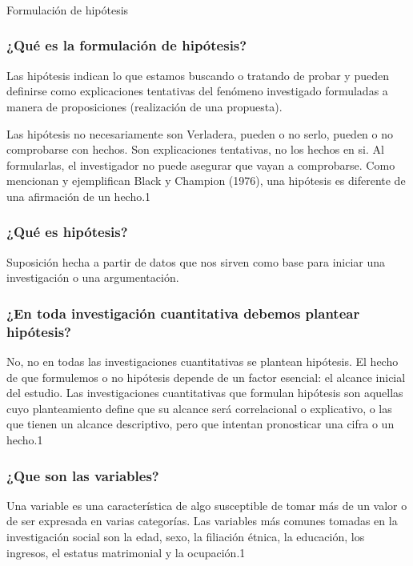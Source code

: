\documentclass{beamer}
\begin{document}
\begin{frame}
	\frametitle{}
	\begin{center}
		{\LARGE Formulación de hipótesis }
	\end{center}						
\end{frame}

	 	
	\begin{frame}
		\frametitle{¿Qué es la formulación de hipótesis?}
		\begin{definition}
			Las hipótesis indican lo que estamos buscando o tratando de probar y pueden definirse como explicaciones tentativas del fenómeno investigado formuladas a manera de proposiciones (realización de una propuesta). 
			
			Las hipótesis no necesariamente    son Verladera, pueden o no serlo, pueden o no comprobarse con hechos. Son explicaciones tentativas, no los hechos en si. Al formularlas, el investigador no puede asegurar que vayan a comprobarse. Como mencionan y ejemplifican Black y Champion (1976), una hipótesis es diferente de una afirmación de un hecho.{1}
			
		\end{definition}
	
	\end{frame}
	\begin{frame}
		\frametitle{¿Qué es hipótesis?}
		\begin{definition}
		Suposición hecha a partir de datos que nos sirven como base para iniciar una investigación o una argumentación.
		\end{definition}
	\end{frame}
		\begin{frame}
			\frametitle{¿En toda investigación cuantitativa debemos
				plantear hipótesis?}
			\begin{definition}
				No, no en todas las investigaciones cuantitativas se plantean hipótesis. El hecho de que formulemos
				o no hipótesis depende de un factor esencial: el alcance inicial del estudio. Las investigaciones cuantitativas
				que formulan hipótesis son aquellas cuyo planteamiento define que su alcance será correlacional
				o explicativo, o las que tienen un alcance descriptivo, pero que intentan pronosticar una cifra
				o un hecho.{1}
			\end{definition}
			
		\end{frame}
	\begin{frame}
		\frametitle{¿Que son las variables?}
		\begin{definition}
			Una variable es una característica de algo susceptible de tomar más de un valor o de ser expresada en varias categorías. Las variables más comunes tomadas en la investigación social son la edad, sexo, la filiación étnica, la educación, los ingresos, el estatus matrimonial y la ocupación.{1}
			
		\end{definition}
	\end{frame}
\end{document}
